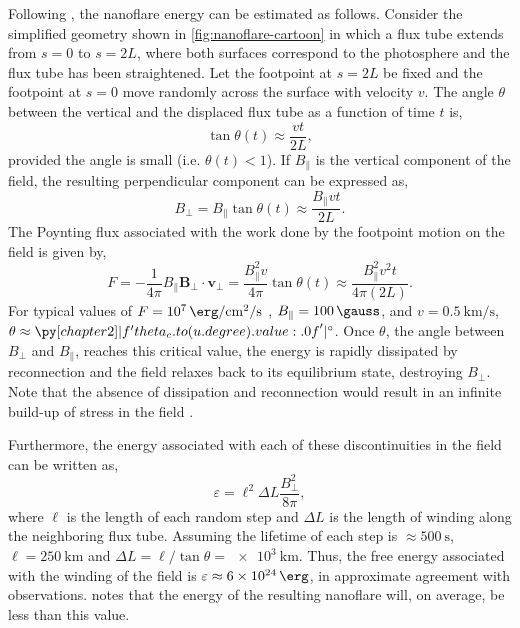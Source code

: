 Following \citet{parker_nanoflares_1988}, the nanoflare energy can be estimated as follows. Consider the simplified geometry shown in \autoref{fig:nanoflare-cartoon} in which a flux tube extends from $s=0$ to $s=2L$, where both surfaces correspond to the photosphere and the flux tube has been straightened. Let the footpoint at $s=2L$ be fixed and the footpoint at $s=0$ move randomly across the surface with velocity $v$. The angle $\theta$ between the vertical and the displaced flux tube as a function of time $t$ is,
\begin{equation}
    \tan{\theta(t)} \approx \frac{vt}{2L},
\end{equation}
provided the angle is small (i.e. $\theta(t)<1$). If $B_\parallel$ is the vertical component of the field, the resulting perpendicular component can be expressed as,
\begin{equation}
    B_\perp = B_\parallel\tan{\theta(t)} \approx \frac{B_\parallel vt}{2L}.
\end{equation}
The Poynting flux associated with the work done by the footpoint motion on the field is given by,
\begin{equation}
    F = -\frac{1}{4\pi}B_\parallel\mathbf{B}_\perp\cdot\mathbf{v}_\perp = \frac{B_\parallel^2 v}{4\pi}\tan{\theta(t)} \approx \frac{B_\parallel^2 v^2 t}{4\pi(2L)}.
\end{equation}
For typical \AR{} values of $F=\SI{e7}{\erg\per\square\cm\per\second}$ \citep{withbroe_mass_1977}, $B_\parallel=\SI{100}{\gauss}$, and $v=\SI{0.5}{\km\per\second}$, $\theta\approx\py[chapter2]|f'{theta_c.to(u.degree).value:.0f}'|\si{\degree}$. Once $\theta$, the angle between $B_\perp$ and $B_\parallel$, reaches this critical value, the energy is rapidly dissipated by reconnection and the field relaxes back to its equilibrium state, destroying $B_\perp$. Note that the absence of dissipation and reconnection would result in an infinite build-up of stress in the field \citep{klimchuk_key_2015}.

Furthermore, the energy associated with each of these discontinuities in the field can be written as,
\begin{equation}
    \varepsilon = \ell^2\Delta L \frac{B_\perp^2}{8\pi},
\end{equation}
where $\ell$ is the length of each random step and $\Delta L$ is the length of winding along the neighboring flux tube. Assuming the lifetime of each step is $\approx\SI{500}{\second}$, $\ell=\SI{250}{\km}$ and $\Delta L=\ell/\tan{\theta}=\SI{e3}{\km}$. Thus, the free energy associated with the winding of the field is $\varepsilon\approx\SI{6e24}{\erg}$, in approximate agreement with observations. \citet{parker_nanoflares_1988} notes that the energy of the resulting nanoflare will, on average, be less than this value.

